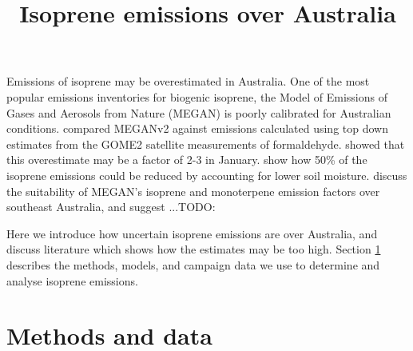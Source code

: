 \documentclass[acp, manuscript]{copernicus} %
\begin{document}
\title{Isoprene emissions over Australia}




\maketitle

\begin{abstract}
  
\end{abstract}

\introduction  %

  Emissions of isoprene may be overestimated in Australia.
  One of the most popular emissions inventories for biogenic isoprene, the Model of Emissions of Gases and Aerosols from Nature (MEGAN) is poorly calibrated for Australian conditions.
  \cite{Muller2008} compared MEGANv2 against emissions calculated using top down estimates from the GOME2 satellite measurements of formaldehyde.
  \cite{Stavrakou2015} showed that this overestimate may be a factor of 2-3 in January.
  \cite{Sindelarova2014} show how 50\% of the isoprene emissions could be reduced by accounting for lower soil moisture.
  \cite{Emmerson2016} discuss the suitability of MEGAN's isoprene and monoterpene emission factors over southeast Australia, and suggest ...TODO:

  Here we introduce how uncertain isoprene emissions are over Australia, and discuss literature which shows how the estimates may be too high.
  Section \ref{sec:MethodsAndData} describes the methods, models, and campaign data we use to determine and analyse isoprene emissions.
  

\section{Methods and data}
  \label{sec:MethodsAndData}
  
\end{document}
